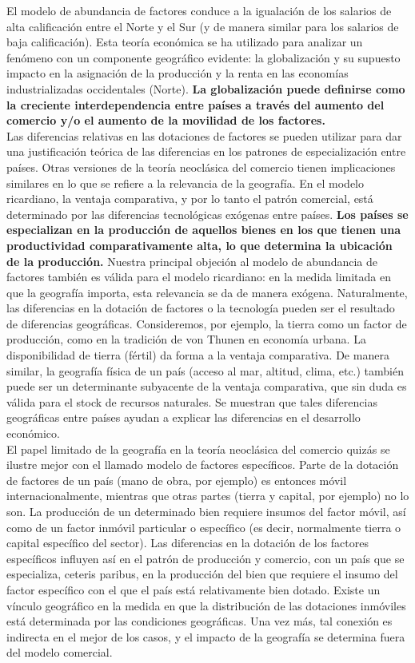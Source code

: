 El modelo de abundancia de factores conduce a la igualación de los salarios de alta calificación entre el Norte y el Sur (y de manera similar para los salarios de baja calificación). Esta teoría económica se ha utilizado para analizar un fenómeno con un componente geográfico evidente: la globalización y su supuesto impacto en la asignación de la producción y la renta en las economías industrializadas occidentales (Norte). \textbf{La globalización puede definirse como la creciente interdependencia entre países a través del aumento del comercio y/o el aumento de la movilidad de los factores.}\\
Las diferencias relativas en las dotaciones de factores se pueden utilizar para dar una justificación teórica de las diferencias en los patrones de especialización entre países. Otras versiones de la teoría neoclásica del comercio tienen implicaciones similares en lo que se refiere a la relevancia de la geografía. En el modelo ricardiano, la ventaja comparativa, y por lo tanto el patrón comercial, está determinado por las diferencias tecnológicas exógenas entre países. \textbf{Los países se especializan en la producción de aquellos bienes en los que tienen una productividad comparativamente alta, lo que determina la ubicación de la producción.} Nuestra principal objeción al modelo de abundancia de factores también es válida para el modelo ricardiano: en la medida limitada en que la geografía importa, esta relevancia se da de manera exógena. Naturalmente, las diferencias en la dotación de factores o la tecnología pueden ser el resultado de diferencias geográficas. Consideremos, por ejemplo, la tierra como un factor de producción, como en la tradición de von Thunen en economía urbana. La disponibilidad de tierra (fértil) da forma a la ventaja comparativa. De manera similar, la geografía física de un país (acceso al mar, altitud, clima, etc.) también puede ser un determinante subyacente de la ventaja comparativa, que sin duda es válida para el stock de recursos naturales. Se  muestran que tales diferencias geográficas entre países ayudan a explicar las diferencias en el desarrollo económico.\\
El papel limitado de la geografía en la teoría neoclásica del comercio quizás se ilustre mejor con el llamado modelo de factores específicos. Parte de la dotación de factores de un país (mano de obra, por ejemplo) es entonces móvil internacionalmente, mientras que otras partes (tierra y capital, por ejemplo) no lo son. La producción de un determinado bien requiere insumos del factor móvil, así como de un factor inmóvil particular o específico (es decir, normalmente tierra o capital específico del sector). Las diferencias en la dotación de los factores específicos influyen así en el patrón de producción y comercio, con un país que se especializa, ceteris paribus, en la producción del bien que requiere el insumo del factor específico con el que el país está relativamente bien dotado. Existe un vínculo geográfico en la medida en que la distribución de las dotaciones inmóviles está determinada por las condiciones geográficas. Una vez más, tal conexión es indirecta en el mejor de los casos, y el impacto de la geografía se determina fuera del modelo comercial.\\
